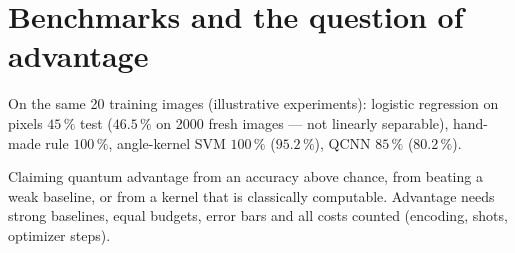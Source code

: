 \documentclass[11pt,a4paper,openany]{book}
\begin{document}
\section{Benchmarks and the question of advantage}
On the same 20 training images (illustrative experiments): logistic regression on pixels $45\,\%$ test ($46.5\,\%$ on 2000 fresh
images --- not linearly separable), hand-made rule $100\,\%$, angle-kernel SVM $100\,\%$ ($95.2\,\%$), QCNN $85\,\%$ ($80.2\,\%$).
\begin{trap}
Claiming quantum advantage from an accuracy above chance, from beating a weak baseline, or from a kernel that is classically
computable. Advantage needs strong baselines, equal budgets, error bars and all costs counted (encoding, shots, optimizer steps).
\end{trap}

\end{document}
